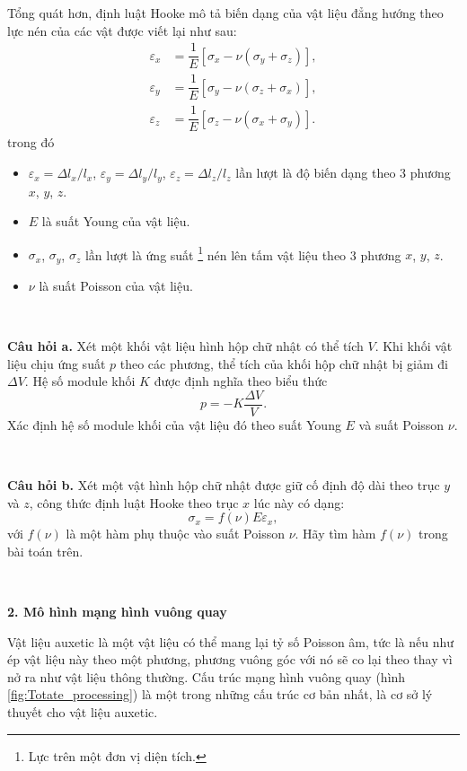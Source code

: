 Tổng quát hơn, định luật Hooke mô tả biến dạng của vật liệu đẳng hướng theo lực nén của các vật được viết lại như sau:
\begin{align*}
    \varepsilon_x &= \dfrac{1}{E} \left[ \sigma_x - \nu \left( \sigma_y + \sigma_z \right) \right], \\
    \varepsilon_y &= \dfrac{1}{E} \left[ \sigma_y - \nu \left( \sigma_z + \sigma_x \right) \right], \\
    \varepsilon_z &= \dfrac{1}{E} \left[ \sigma_z - \nu \left( \sigma_x + \sigma_y \right) \right].
\end{align*}
trong đó
\begin{itemize}
    \item \( \varepsilon_x = \Delta l_x / l_x \), \( \varepsilon_y = \Delta l_y / l_y\), \( \varepsilon_z = \Delta l_z / l_z\) lần lượt là độ biến dạng theo 3 phương \(x\), \(y\), \(z\).
    \item \(E\) là suất Young của vật liệu.
    \item \(\sigma_x\), \(\sigma_y\), \(\sigma_z\) lần lượt là ứng suất \footnote{Lực trên một đơn vị diện tích.} nén lên tấm vật liệu theo 3 phương \(x\), \(y\), \(z\).
    \item \(\nu\) là suất Poisson của vật liệu.
\end{itemize}

\ \ 

\textbf{Câu hỏi a.} Xét một khối vật liệu hình hộp chữ nhật có thể tích \(V\). Khi khối vật liệu chịu ứng suất \(p\) theo các phương, thể tích của khối hộp chữ nhật bị giảm đi \(\Delta V\). Hệ số module khối \(K\) được định nghĩa theo biểu thức
\begin{equation}
    p = - K \dfrac{\Delta V}{V}.
\end{equation}
Xác định hệ số module khối của vật liệu đó theo suất Young \(E\) và suất Poisson \(\nu\).

\ \ 

\textbf{Câu hỏi b.} Xét một vật hình hộp chữ nhật được giữ cố định độ dài theo trục \(y\) và \(z\), công thức định luật Hooke theo trục \(x\) lúc này có dạng:
\begin{equation}
    \sigma_x = f(\nu) E \varepsilon_x,
\end{equation}
với \( f(\nu) \) là một hàm phụ thuộc vào suất Poisson \(\nu\). Hãy tìm hàm \( f(\nu) \) trong bài toán trên.

\ \ 

\textbf{2. Mô hình mạng hình vuông quay}

Vật liệu auxetic là một vật liệu có thể mang lại tỷ số Poisson âm, tức là nếu như ép vật liệu này theo một phương, phương vuông góc với nó sẽ co lại theo thay vì nở ra như vật liệu thông thường. Cấu trúc mạng hình vuông quay (hình \ref{fig:Totate_processing}) là một trong những cấu trúc cơ bản nhất, là cơ sở lý thuyết cho vật liệu auxetic.

